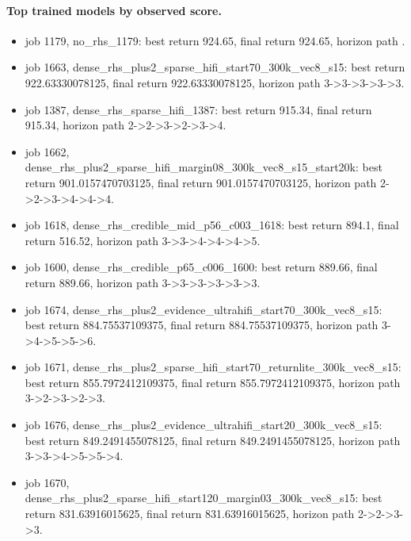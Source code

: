 \paragraph{Top trained models by observed score.}
\begin{itemize}
\item job 1179, no\_rhs\_1179: best return 924.65, final return 924.65, horizon path .
\item job 1663, dense\_rhs\_plus2\_sparse\_hifi\_start70\_300k\_vec8\_s15: best return 922.63330078125, final return 922.63330078125, horizon path 3->3->3->3->3.
\item job 1387, dense\_rhs\_sparse\_hifi\_1387: best return 915.34, final return 915.34, horizon path 2->2->3->2->3->4.
\item job 1662, dense\_rhs\_plus2\_sparse\_hifi\_margin08\_300k\_vec8\_s15\_start20k: best return 901.0157470703125, final return 901.0157470703125, horizon path 2->2->3->4->4->4.
\item job 1618, dense\_rhs\_credible\_mid\_p56\_c003\_1618: best return 894.1, final return 516.52, horizon path 3->3->4->4->4->5.
\item job 1600, dense\_rhs\_credible\_p65\_c006\_1600: best return 889.66, final return 889.66, horizon path 3->3->3->3->3->3.
\item job 1674, dense\_rhs\_plus2\_evidence\_ultrahifi\_start70\_300k\_vec8\_s15: best return 884.75537109375, final return 884.75537109375, horizon path 3->4->5->5->6.
\item job 1671, dense\_rhs\_plus2\_sparse\_hifi\_start70\_returnlite\_300k\_vec8\_s15: best return 855.7972412109375, final return 855.7972412109375, horizon path 3->2->3->2->3.
\item job 1676, dense\_rhs\_plus2\_evidence\_ultrahifi\_start20\_300k\_vec8\_s15: best return 849.2491455078125, final return 849.2491455078125, horizon path 3->3->4->5->5->4.
\item job 1670, dense\_rhs\_plus2\_sparse\_hifi\_start120\_margin03\_300k\_vec8\_s15: best return 831.63916015625, final return 831.63916015625, horizon path 2->2->3->3.
\end{itemize}

